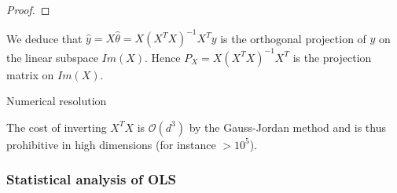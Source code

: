 \documentclass[
10pt, %
a4paper, %
oneside, %
headinclude,footinclude, %
BCOR5mm, %
]{scrartcl}
\begin{document}
\begin{proof}
% 
% 
% 
% 
% 
% 
% 
% 
% 
% 

\end{proof}

\begin{remark}

    We deduce that $ \hat{y} = X \hat{\theta} = X(X^TX)^{-1}X^Ty$ is the orthogonal projection of $y$ on the linear subspace $ Im(X)$. Hence $P_X = X(X^TX)^{-1}X^T$ is the projection matrix on $Im(X)$.
    
\end{remark}


\begin{remark}{Numerical resolution}

The cost of inverting $X^TX$ is $ \mathcal{O} (d^3)$ by the Gauss-Jordan method and is thus prohibitive in high dimensions (for instance $ > 10^5$).
\end{remark}


\subsubsection{\large\color{Periwinkle}Statistical analysis of OLS}
\end{document}
